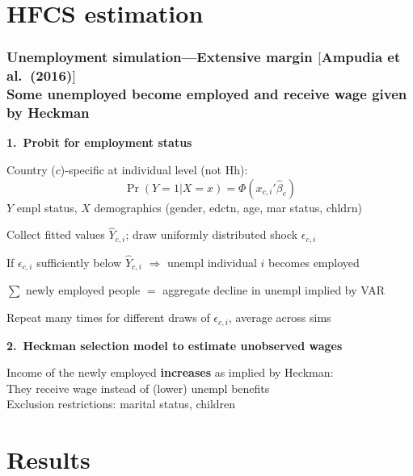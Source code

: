 \documentclass[pdflatex,aspectratio=169]{beamer}
\newcommand{\jemph}[1]{{\color{StataDarkBlue}#1}}
\newcommand{\jbemph}[1]{\textbf{\color{SlideNavy}#1}}
\begin{document}
\section{HFCS estimation}



\begin{frame}\frametitle{\bf\large Unemployment simulation---Extensive margin {\scriptsize$[$Ampudia et al.\ (2016)$]$}\\
\small Some unemployed become employed and receive wage given by Heckman}
\begin{block}{\jbemph{\small 1.\ Probit for employment status}}
\small
\bi
\setlength{\itemsep}{0mm}
\item Country ($c$)-specific at individual level (not Hh): $$\Pr(Y=1|X=x) = \Phi(x_{c,i}'\hat\beta_c)$$
$Y$ empl status, $X$ demographics (gender, edctn, age, mar status, chldrn)
\item Collect fitted values $\hat Y_{c,i}$; draw \jemph{uniformly distributed} shock $\epsilon_{c,i}$
\item \jemph{If $\epsilon_{c,i}$ sufficiently below $\hat Y_{c,i}$ $\Rightarrow$ unempl individual $i$ becomes employed}
\item \jemph{$\sum$ newly employed people ${}={}$ aggregate decline in unempl implied by VAR}
\item Repeat many times for different draws of $\epsilon_{c,i}$, average across sims
\ei
\end{block}

\begin{block}{\jbemph{\small 2.\ Heckman selection model to estimate unobserved wages}}
\small
\bi
\item \jemph{Income of the newly employed \jbemph{increases} as implied by Heckman:}\\[0mm]
They receive wage instead of (lower) unempl benefits\\
{\scriptsize{Exclusion restrictions: marital status, children}}
\ei
\end{block}

\end{frame}

\section{Results}
\end{document}
